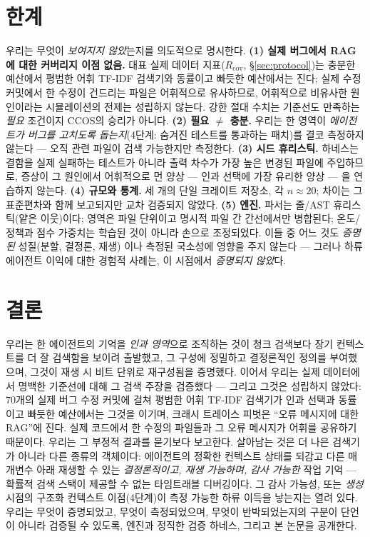 \documentclass[11pt]{article}
\begin{document}
\section{한계}

우리는 무엇이 \emph{보여지지 않았}는지를 의도적으로 명시한다.
\textbf{(1) 실제 버그에서 RAG에 대한 커버리지 이점 없음.} 대표 실제 데이터 지표($R_{\mathrm{cov}}$,
\S\ref{sec:protocol})는 충분한 예산에서 평범한 어휘 TF-IDF 검색기와 동률이고 빠듯한 예산에서는 진다; 실제 수정 커밋에서
한 수정이 건드리는 파일은 어휘적으로 유사하므로, 어휘적으로 비유사한 원인이라는 시뮬레이션의 전제는 성립하지 않는다.
강한 절대 수치는 기준선도 만족하는 \emph{필요} 조건이지 CCOS의 승리가 아니다.
\textbf{(2) 필요 $\neq$ 충분.} 우리는 한 영역이 \emph{에이전트가 버그를 고치도록 돕는지}(4단계: 숨겨진 테스트를
통과하는 패치)를 결코 측정하지 않는다 --- 오직 관련 파일이 검색 가능한지만 측정한다.
\textbf{(3) 시드 휴리스틱.} 하네스는 결함을 실제 실패하는 테스트가 아니라 출력 차수가 가장 높은 변경된 파일에 주입하므로,
증상이 그 원인에서 어휘적으로 먼 양상 --- 인과 선택에 가장 유리한 양상 --- 을 연습하지 않는다.
\textbf{(4) 규모와 통계.} 세 개의 단일 크레이트 저장소, 각 $n\!\approx\!20$; 차이는 그 표준편차와 함께 보고되지만 교차
검증되지 않았다.
\textbf{(5) 엔진.} 파서는 줄/AST 휴리스틱(얕은 이웃)이다; 영역은 파일 단위이고 명시적 파일 간 간선에서만 병합된다;
온도/정책과 점수 가중치는 학습된 것이 아니라 손으로 조정되었다. 이들 중 어느 것도 \emph{증명된} 성질(분할, 결정론, 재생)
이나 측정된 국소성에 영향을 주지 않는다 --- 그러나 하류 에이전트 이익에 대한 경험적 사례는, 이 시점에서 \emph{증명되지
않았}다.

\section{결론}

우리는 한 에이전트의 기억을 \emph{인과 영역}으로 조직하는 것이 청크 검색보다 장기 컨텍스트를 더 잘 검색함을 보이려
출발했고, 그 구성에 정밀하고 결정론적인 정의를 부여했으며, 그것이 재생 시 비트 단위로 재구성됨을 증명했다. 이어서 우리는
실제 데이터에서 명백한 기준선에 대해 그 검색 주장을 검증했다 --- 그리고 그것은 성립하지 않았다: $70$개의 실제 버그 수정
커밋에 걸쳐 평범한 어휘 TF-IDF 검색기가 인과 선택과 동률이고 빠듯한 예산에서는 그것을 이기며, 크래시 트레이스 피벗은
``오류 메시지에 대한 RAG''에 진다. 실제 코드에서 한 수정의 파일들과 그 오류 메시지가 어휘를 공유하기 때문이다. 우리는 그
부정적 결과를 묻기보다 보고한다. 살아남는 것은 더 나은 검색기가 아니라 다른 종류의 객체이다: 에이전트의 정확한 컨텍스트
상태를 되감고 다른 매개변수 아래 재생할 수 있는 \emph{결정론적이고, 재생 가능하며, 감사 가능한} 작업 기억 --- 확률적 검색
스택이 제공할 수 없는 타임트래블 디버깅이다. 그 감사 가능성, 또는 \emph{생성} 시점의 구조화 컨텍스트 이점(4단계)이
측정 가능한 하류 이득을 낳는지는 열려 있다. 우리는 무엇이 증명되었고, 무엇이 측정되었으며, 무엇이 반박되었는지의 구분이
단언이 아니라 검증될 수 있도록, 엔진과 정직한 검증 하네스, 그리고 본 논문을 공개한다.
\end{document}
